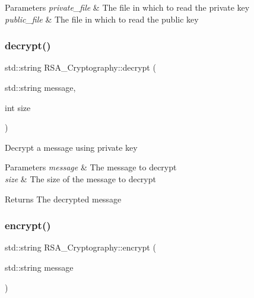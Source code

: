 \begin{DoxyParams}{Parameters}
{\em private\+\_\+file} & The file in which to read the private key \\
\hline
{\em public\+\_\+file} & The file in which to read the public key \\
\hline
\end{DoxyParams}
\mbox{\label{classRSA__Cryptography_a03760e4f7eae8e7b961f8b948c0dafb1}} 
\subsubsection{\texorpdfstring{decrypt()}{decrypt()}}
{\footnotesize\ttfamily std\+::string R\+S\+A\+\_\+\+Cryptography\+::decrypt (\begin{DoxyParamCaption}\item[{std\+::string}]{message,  }\item[{int}]{size }\end{DoxyParamCaption})}

Decrypt a message using private key


\begin{DoxyParams}{Parameters}
{\em message} & The message to decrypt \\
\hline
{\em size} & The size of the message to decrypt \\
\hline
\end{DoxyParams}
\begin{DoxyReturn}{Returns}
The decrypted message 
\end{DoxyReturn}
\mbox{\label{classRSA__Cryptography_a8ea8d421dcb5012ffc8fd23660bae1bc}} 
\subsubsection{\texorpdfstring{encrypt()}{encrypt()}}
{\footnotesize\ttfamily std\+::string R\+S\+A\+\_\+\+Cryptography\+::encrypt (\begin{DoxyParamCaption}\item[{std\+::string}]{message }\end{DoxyParamCaption})}

